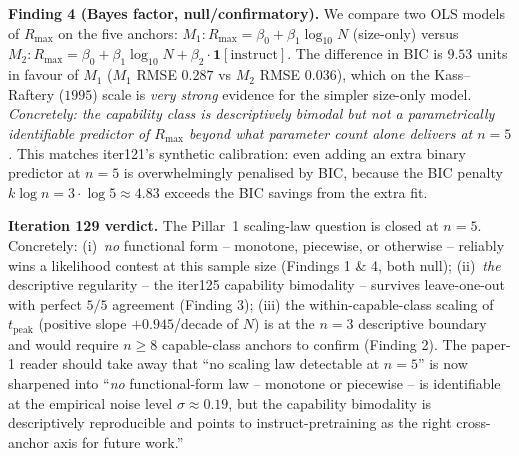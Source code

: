 \textbf{Finding 4 (Bayes factor, null/confirmatory).}  We compare
two OLS models of $R_{\max}$ on the five anchors:
$M_1\!: R_{\max} = \beta_0 + \beta_1 \log_{10} N$ (size-only)
versus
$M_2\!: R_{\max} = \beta_0 + \beta_1 \log_{10} N + \beta_2 \cdot
\mathbf{1}[\text{instruct}]$.  The difference in BIC is
$9.53$ units in favour of $M_1$ ($M_1$ RMSE $0.287$ vs $M_2$
RMSE $0.036$), which on the Kass--Raftery ($1995$) scale is
\emph{very strong} evidence for the simpler size-only model.
\emph{Concretely: the capability class is descriptively bimodal
but not a parametrically identifiable predictor of $R_{\max}$
beyond what parameter count alone delivers at $n=5$.}  This
matches iter121's synthetic calibration: even adding an extra
binary predictor at $n=5$ is overwhelmingly penalised by BIC,
because the BIC penalty $k \log n = 3 \cdot \log 5 \approx
4.83$ exceeds the BIC savings from the extra fit.

\textbf{Iteration 129 verdict.}  The Pillar~1 scaling-law
question is closed at $n=5$.  Concretely:
(i)~\emph{no} functional form -- monotone, piecewise, or
otherwise -- reliably wins a likelihood contest at this sample
size (Findings 1 \& 4, both null);
(ii)~\emph{the} descriptive regularity -- the iter125 capability
bimodality -- survives leave-one-out with perfect $5/5$
agreement (Finding 3);
(iii) the within-capable-class scaling of $t_\mathrm{peak}$
(positive slope $+0.945$/decade of $N$) is at the $n=3$
descriptive boundary and would require $n \ge 8$ capable-class
anchors to confirm (Finding 2).  The paper-1 reader should take
away that ``no scaling law detectable at $n=5$'' is now sharpened
into ``\emph{no} functional-form law -- monotone or piecewise
-- is identifiable at the empirical noise level
$\sigma \approx 0.19$, but the capability bimodality is
descriptively reproducible and points to instruct-pretraining as
the right cross-anchor axis for future work.''

